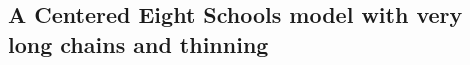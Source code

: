 \documentclass[american,]{article}
\let\oldparagraph\paragraph
\renewcommand{\paragraph}[1]{\oldparagraph{#1}\mbox{}}
\begin{document}







\hypertarget{a-centered-eight-schools-model-1}{%
\subsection*{A Centered Eight Schools model with very long chains and
thinning}\label{a-centered-eight-schools-model-1}}

\end{document}
